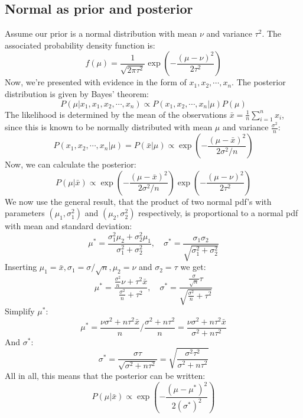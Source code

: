 \documentclass[12pt, a4paper]{article}
\begin{document}
\subsection{Normal as prior and posterior}
Assume our prior is a normal distribution with mean $\nu$ and variance $\tau^2$. The associated probability density function is:
\begin{equation}
f(\mu)=\frac{1}{\sqrt{2\pi\tau^2}}\exp\left(-\frac{(\mu-\nu)^2}{2\tau^2}\right)
\end{equation}
Now, we're presented with evidence in the form of $x_1,x_2,\cdots,x_n$. The posterior distribution is given by Bayes' theorem:
\begin{equation}
P(\mu|x_1,x_1,x_2,\cdots,x_n)\propto P(x_1,x_2,\cdots,x_n|\mu)P(\mu)
\end{equation}
The likelihood is determined by the mean of the observations $\bar{x}=\frac{1}{n}\sum_{i=1}^n x_i$, since this is known to be normally distributed with mean $\mu$ and variance $\frac{\sigma^2}{n}$:
\begin{equation}
P(x_1,x_2,\cdots,x_n|\mu)=P(\bar{x}|\mu)\propto\exp\left(-\frac{(\mu-\bar{x})^2}{2\sigma^2/n}\right)
\end{equation}
Now, we can calculate the posterior:
\begin{equation}
P(\mu|\bar{x})\propto\exp\left(-\frac{(\mu-\bar{x})^2}{2\sigma^2/n}\right)\exp\left(-\frac{(\mu-\nu)^2}{2\tau^2}\right)
\end{equation}
We now use the general result, that the product of two normal pdf's with parameters $(\mu_1,\sigma_1^2)$ and $(\mu_2,\sigma_2^2)$ respectively, is proportional to a normal pdf with mean and standard deviation:
\begin{equation}
\mu^*=\frac{\sigma_1^2\mu_2+\sigma_2^2\mu_1}{\sigma_1^2+\sigma_2^2},\quad\sigma^*=\frac{\sigma_1\sigma_2}{\sqrt{\sigma_1^2+\sigma_2^2}}
\end{equation}
Inserting $\mu_1=\bar{x}, \sigma_1=\sigma/\sqrt{n}, \mu_2=\nu$ and $\sigma_2=\tau$ we get:
\begin{equation}
\mu^*=\frac{\frac{\sigma^2}{n}\nu+\tau^2\bar{x}}{\frac{\sigma^2}{n}+\tau^2},\quad\sigma^*=\frac{\frac{\sigma}{\sqrt{n}}\tau}{\sqrt{\frac{\sigma^2}{n}+\tau^2}}
\end{equation}
Simplify $\mu^*$:
\begin{equation}
\label{posterior_mu_formula}
\mu^*=\frac{\nu\sigma^2+n\tau^2\bar{x}}{n}/\frac{\sigma^2+n\tau^2}{n}=\frac{\nu\sigma^2+n\tau^2\bar{x}}{\sigma^2+n\tau^2}
\end{equation}
And $\sigma^*$:
\begin{equation}
\label{posterior_sigma_formula}
\sigma^*=\frac{\sigma\tau}{\sqrt{\sigma^2+n\tau^2}}=\sqrt{\frac{\sigma^2\tau^2}{\sigma^2+n\tau^2}}
\end{equation}
All in all, this means that the posterior can be written:
\begin{equation}
P(\mu|\bar{x})\propto\exp\left(-\frac{(\mu-\mu^*)^2}{2(\sigma^*)^2}\right)
\end{equation}
\end{document}
